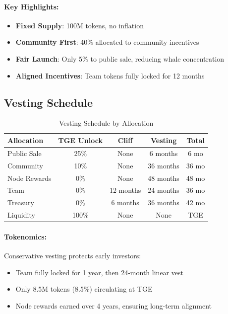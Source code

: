 \documentclass[12pt,a4paper]{article}
\begin{document}
\paragraph{Key Highlights:}
\begin{itemize}
    \item \textbf{Fixed Supply}: 100M tokens, no inflation
    \item \textbf{Community First}: 40\% allocated to community incentives
    \item \textbf{Fair Launch}: Only 5\% to public sale, reducing whale concentration
    \item \textbf{Aligned Incentives}: Team tokens fully locked for 12 months
\end{itemize}

\subsection{Vesting Schedule}

\begin{table}[h]
\centering
\begin{tabular}{lcccc}
\toprule
\textbf{Allocation} & \textbf{TGE Unlock} & \textbf{Cliff} & \textbf{Vesting} & \textbf{Total} \\
\midrule
Public Sale & 25\% & None & 6 months & 6 mo \\
Community & 10\% & None & 36 months & 36 mo \\
Node Rewards & 0\% & None & 48 months & 48 mo \\
Team & 0\% & 12 months & 24 months & 36 mo \\
Treasury & 0\% & 6 months & 36 months & 42 mo \\
Liquidity & 100\% & None & None & TGE \\
\bottomrule
\end{tabular}
\caption{Vesting Schedule by Allocation}
\end{table}

\paragraph{Tokenomics:} Conservative vesting protects early investors:
\begin{itemize}
    \item Team fully locked for 1 year, then 24-month linear vest
    \item Only 8.5M tokens (8.5\%) circulating at TGE
    \item Node rewards earned over 4 years, ensuring long-term alignment
\end{itemize}
\end{document}
